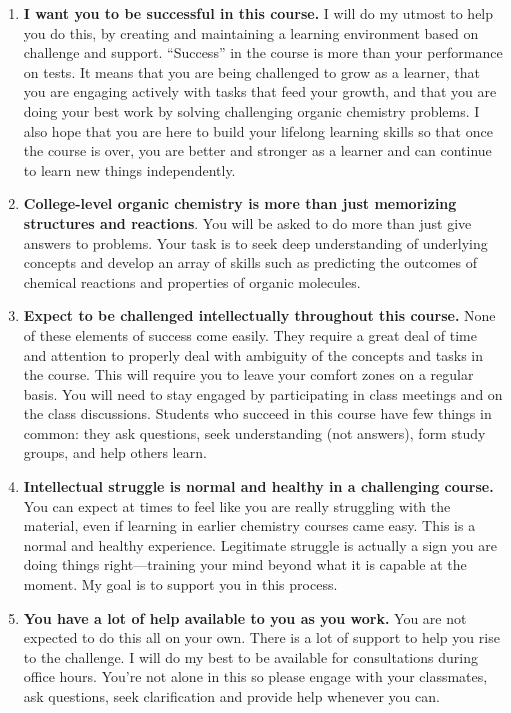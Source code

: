 \begin{enumerate}
\def\labelenumi{\arabic{enumi}.}
\tightlist
\item
  \textbf{I want you to be successful in this course.} I will do my
  utmost to help you do this, by creating and maintaining a learning
  environment based on challenge and support. ``Success'' in the course
  is more than your performance on tests. It means that you are being
  challenged to grow as a learner, that you are engaging actively with
  tasks that feed your growth, and that you are doing your best work by
  solving challenging organic chemistry problems. I also hope that you
  are here to build your lifelong learning skills so that once the
  course is over, you are better and stronger as a learner and can
  continue to learn new things independently.
\item
  \textbf{College-level organic chemistry is more than just memorizing
  structures and reactions}. You will be asked to do more than just give
  answers to problems. Your task is to seek deep understanding of
  underlying concepts and develop an array of skills such as predicting
  the outcomes of chemical reactions and properties of organic
  molecules.
\item
  \textbf{Expect to be challenged intellectually throughout this
  course.} None of these elements of success come easily. They require a
  great deal of time and attention to properly deal with ambiguity of
  the concepts and tasks in the course. This will require you to leave
  your comfort zones on a regular basis. You will need to stay engaged
  by participating in class meetings and on the class discussions.
  Students who succeed in this course have few things in common: they
  ask questions, seek understanding (not answers), form study groups,
  and help others learn.
\item
  \textbf{Intellectual struggle is normal and healthy in a challenging
  course.} You can expect at times to feel like you are really
  struggling with the material, even if learning in earlier chemistry
  courses came easy. This is a normal and healthy experience. Legitimate
  struggle is actually a sign you are doing things right---training your
  mind beyond what it is capable at the moment. My goal is to support
  you in this process.
\item
  \textbf{You have a lot of help available to you as you work.} You are
  not expected to do this all on your own. There is a lot of support to
  help you rise to the challenge. I will do my best to be available for
  consultations during office hours. You're not alone in this so please
  engage with your classmates, ask questions, seek clarification and
  provide help whenever you can.
\end{enumerate}

